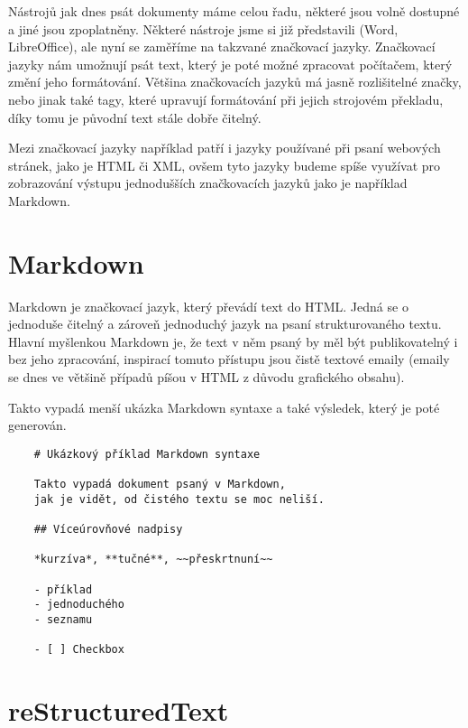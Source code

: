 Nástrojů jak dnes psát dokumenty máme celou řadu, některé jsou volně dostupné a jiné jsou zpoplatněny. Některé nástroje jsme si již představili (Word, LibreOffice), ale
nyní se zaměříme na takzvané značkovací jazyky. Značkovací jazyky nám umožnují psát text, který je poté možné zpracovat počítačem, který změní jeho formátování. Většina
značkovacích jazyků má jasně rozlišitelné značky, nebo jinak také tagy, které upravují formátování při jejich strojovém překladu, díky tomu je původní text stále dobře čitelný.
\cite{markup}

Mezi značkovací jazyky například patří i jazyky používané při psaní webových stránek, jako je HTML či XML, ovšem tyto jazyky budeme spíše využívat pro zobrazování výstupu
jednodušších značkovacích jazyků jako je například Markdown.

\section{Markdown}

Markdown je značkovací jazyk, který převádí text do HTML. Jedná se o jednoduše čitelný a zároveň jednoduchý jazyk na psaní strukturovaného textu. Hlavní myšlenkou Markdown je, že
text v něm psaný by měl být publikovatelný i bez jeho zpracování, inspirací tomuto přístupu jsou čistě textové emaily (emaily se dnes ve většině případů píšou v HTML
z důvodu grafického obsahu). \cite{markdown}


Takto vypadá menší ukázka Markdown syntaxe a také výsledek, který je poté generován.

\clearpage

\begin{verbatim}
    # Ukázkový příklad Markdown syntaxe

    Takto vypadá dokument psaný v Markdown,
    jak je vidět, od čistého textu se moc neliší.

    ## Víceúrovňové nadpisy

    *kurzíva*, **tučné**, ~~přeskrtnuní~~

    - příklad
    - jednoduchého
    - seznamu

    - [ ] Checkbox
\end{verbatim}



\section{reStructuredText}

